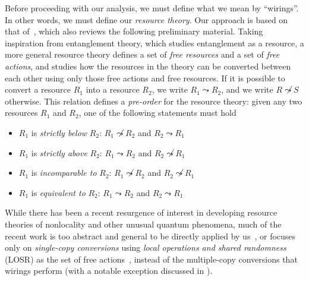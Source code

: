 \documentclass[10pt, a4paper]{article}
\numberwithin{equation}{section} %
\theoremstyle{definition}
\theoremstyle{plain}
\newcommand{\?}{\mathrel{?}} %
\begin{document}
      Before proceeding with our analysis, we must define what we mean by ``wirings''. In other words, we must define our \emph{resource theory}. Our approach is based on that of~\cite{BellResourceTheory}, which also reviews the following preliminary material. Taking inspiration from entanglement theory, which studies entanglement as a resource, a more general resource theory defines a set of \emph{free resources} and a set of \emph{free actions}, and studies how the resources in the theory can be converted between each other using only those free actions and free resources. If it is possible to convert a resource \(R_1\) into a resource \(R_2\), we write \(R_1 \leadsto R_2\), and we write \(R \not\leadsto S\) otherwise. This relation defines a \emph{pre-order} for the resource theory: given any two resources \(R_1\) and \(R_2\), one of the following statements must hold
      \begin{itemize}
        \item \(R_1\) is \emph{strictly below} \(R_2\): \(R_1 \not\leadsto R_2\) and \(R_2 \leadsto R_1\)
        \item \(R_1\) is \emph{strictly above} \(R_2\): \(R_1 \leadsto R_2\) and \(R_2 \not\leadsto R_1\)
        \item \(R_1\) is \emph{incomparable to} \(R_2\): \(R_1 \not\leadsto R_2\) and \(R_2 \not\leadsto R_1\)
        \item \(R_1\) is \emph{equivalent to} \(R_2\): \(R_1 \leadsto R_2\) and \(R_2 \leadsto R_1\)
      \end{itemize}

      While there has been a recent resurgence of interest in developing resource theories of nonlocality and other unusual quantum phenomena, much of the recent work is too abstract and general to be directly applied by us~\cite{Monotones, TypeIndepLOSR}, or focuses only on \emph{single-copy conversions} using \emph{local operations and shared randomness} (LOSR) as the set of free actions~\cite{BellResourceTheory, TraceDistNL, NLMeas}, instead of the multiple-copy conversions that wirings perform (with a notable exception discussed in ).
\end{document}
